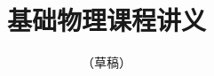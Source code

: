 \documentclass[11pt]{physics}
\begin{document}
\frontmatter
\title{\K 基础物理课程讲义}
\author{\simhei \small （草稿）}
\maketitle
\tableofcontents
\mainmatter






\end{document}
